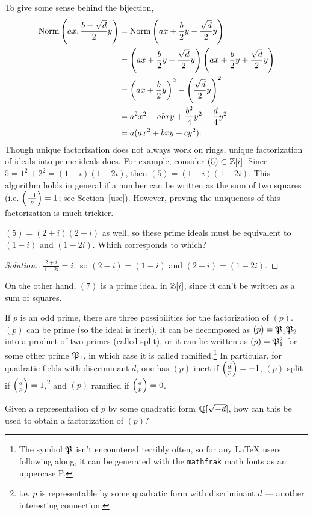 To give some sense behind the bijection,
\begin{align*}
\operatorname{Norm}\left(ax,\frac{b-\sqrt{d}}{2} y\right) &= \operatorname{Norm}\left(ax + \frac{b}{2}y -\frac{\sqrt{d}}{2}y\right)\\
&= \left(ax+\frac{b}{2}y - \frac{\sqrt{d}}{2}y\right)\left(ax+\frac{b}{2}y + \frac{\sqrt{d}}{2}y\right)\\
&= \left(ax+\frac{b}{2}y\right)^2 - \left(\frac{\sqrt{d}}{2}y\right)^2\\
& = a^2x^2 + abxy + \frac{b^2}{4}y^2 -\frac{d}{4}y^2\\
&= a(ax^2+bxy+cy^2).
\end{align*}
Though unique factorization does not always work on rings, unique factorization of ideals into prime ideals does. For example, consider $(5)\subset\mathbb{Z}[i]$. Since $5 = 1^2+2^2 = (1-i)(1-2i)$, then $(5) = (1-i)(1-2i)$. This algorithm holds in general if a number can be written as the sum of two squares (i.e. $\left(\frac{-1}{p}\right) = 1$; see Section~\ref{use}). However, proving the uniqueness of this factorization is much trickier.
\begin{ex}
$(5) = (2+i)(2-i)$ as well, so these prime ideals must be equivalent to $(1-i)$ and $(1-2i)$. Which corresponds to which?
\end{ex}
\begin{proof}[Solution:]
$\frac{2+i}{1-2i} = i,$ so $(2-i)=(1-i)$ and $(2+i) = (1-2i)$.
\end{proof}
On the other hand, $(7)$ is a prime ideal in $\mathbb{Z}[i]$, since it can't be written as a sum of squares.

If $p$ is an odd prime, there are three possibilities for the factorization of $(p)$. $(p)$ can be prime (so the ideal is inert), it can be decomposed as $(p) = \mathfrak{P}_1\mathfrak{P}_2$ into a product of two primes (called split), or it can be written as $(p) = \mathfrak{P}_1^2$ for some other prime $\mathfrak{P}_1$, in which case it is called ramified.\footnote{The symbol $\mathfrak{P}$ isn't encountered terribly often, so for any \LaTeX{} users following along, it can be generated with the \texttt{mathfrak} math fonts as an uppercase P.} In particular, for quadratic fields with discriminant $d$, one has $(p)$ inert if $\left(\frac{d}{p}\right) = -1$, $(p)$ split if $\left(\frac{d}{p}\right) = 1$,\footnote{i.e. $p$ is representable by some quadratic form with discriminant $d$ --- another interesting connection.} and $(p)$ ramified if $\left(\frac{d}{p}\right) = 0$.
\begin{ex}
Given a representation of $p$ by some quadratic form $\mathbb{Q}[\sqrt{-d}]$, how can this be used to obtain a factorization of $(p)$?
\end{ex}
